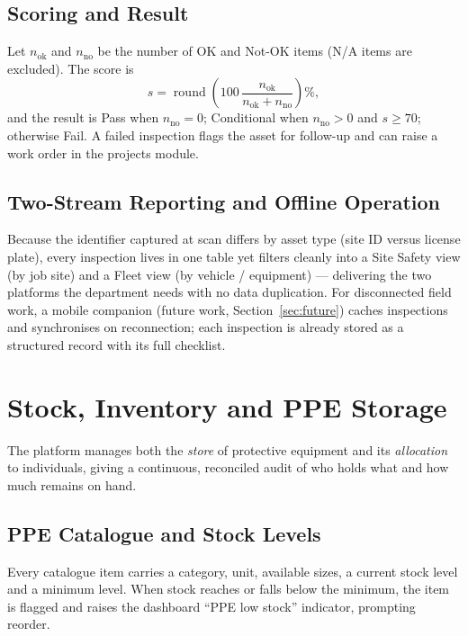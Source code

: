 \documentclass[11pt]{article}
\begin{document}
\subsection{Scoring and Result}
Let $n_{\mathrm{ok}}$ and $n_{\mathrm{no}}$ be the number of OK and Not-OK items (N/A items are
excluded). The score is
\[
s = \operatorname{round}\!\left( 100 \, \frac{n_{\mathrm{ok}}}{n_{\mathrm{ok}} + n_{\mathrm{no}}} \right)\%,
\]
and the result is \textsf{Pass} when $n_{\mathrm{no}} = 0$; \textsf{Conditional} when $n_{\mathrm{no}} > 0$
and $s \geq 70$; otherwise \textsf{Fail}. A failed inspection flags the asset for follow-up and can
raise a work order in the projects module.

\subsection{Two-Stream Reporting and Offline Operation}
Because the identifier captured at scan differs by asset type (site ID versus license plate), every
inspection lives in one table yet filters cleanly into a Site Safety view (by job site) and a Fleet
view (by vehicle / equipment) --- delivering the two platforms the department needs with no data
duplication. For disconnected field work, a mobile companion (future work, Section~\ref{sec:future})
caches inspections and synchronises on reconnection; each inspection is already stored as a structured
record with its full checklist.

\section{Stock, Inventory and PPE Storage}\label{sec:stock}
The platform manages both the \emph{store} of protective equipment and its \emph{allocation} to
individuals, giving a continuous, reconciled audit of who holds what and how much remains on hand.

\subsection{PPE Catalogue and Stock Levels}
Every catalogue item carries a category, unit, available sizes, a current stock level and a minimum
level. When stock reaches or falls below the minimum, the item is flagged and raises the dashboard
``PPE low stock'' indicator, prompting reorder.
\end{document}
